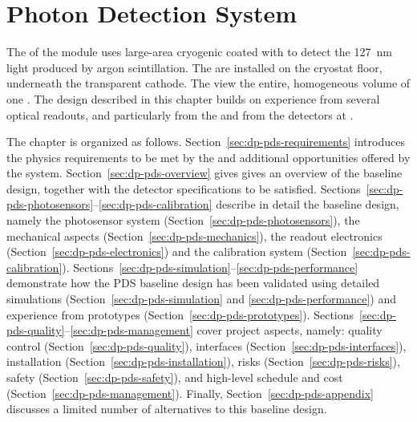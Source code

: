 \chapter{Photon Detection System}
\label{ch:dp-pds}

The  of the   module uses large-area cryogenic  coated with  to detect the \SI{127}{\nm} light produced by argon scintillation. The  are installed on the cryostat floor, underneath the  transparent cathode. The   view the entire, homogeneous  volume of one . The design described in this chapter builds on experience from several  optical readouts, and particularly from the  and from the  detectors at . 

The chapter is organized as follows. Section~\ref{sec:dp-pds-requirements} introduces the physics requirements to be met by the  and additional opportunities offered by the system. Section~\ref{sec:dp-pds-overview} gives gives an overview of the  baseline design, together with the detector specifications to be satisfied. Sections~\ref{sec:dp-pds-photosensors}--\ref{sec:dp-pds-calibration} describe in detail the  baseline design, namely the  photosensor system (Section~\ref{sec:dp-pds-photosensors}), the mechanical aspects (Section~\ref{sec:dp-pds-mechanics}),  the readout electronics (Section~\ref{sec:dp-pds-electronics}) and the calibration system (Section~\ref{sec:dp-pds-calibration}). Sections~\ref{sec:dp-pds-simulation}--\ref{sec:dp-pds-performance} demonstrate how the PDS baseline design has been validated using detailed simulations (Section~\ref{sec:dp-pds-simulation} and \ref{sec:dp-pds-performance}) and experience from prototypes (Section~\ref{sec:dp-pds-prototypes}). Sections~\ref{sec:dp-pds-quality}--\ref{sec:dp-pds-management} cover  project aspects, namely: quality control (Section~\ref{sec:dp-pds-quality}), interfaces (Section~\ref{sec:dp-pds-interfaces}), installation (Section~\ref{sec:dp-pds-installation}), risks (Section~\ref{sec:dp-pds-risks}), safety (Section~\ref{sec:dp-pds-safety}), and high-level schedule and cost (Section~\ref{sec:dp-pds-management}). Finally, Section~\ref{sec:dp-pds-appendix} discusses a limited number of alternatives to this baseline design.  
















